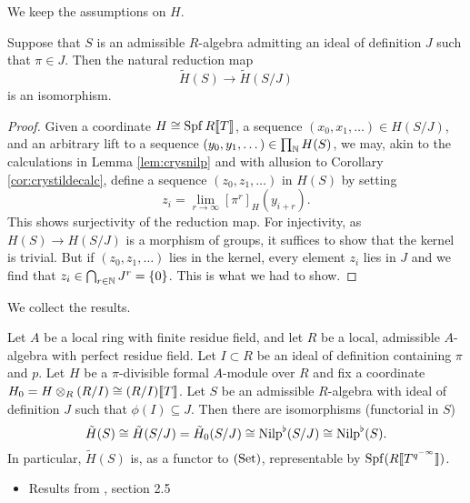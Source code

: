 We keep the assumptions on $H$.
\begin{lem}
  Suppose that $S$ is an admissible $R$-algebra admitting an ideal of definition
  $J$ such that $\pi \in J$. Then the natural reduction map
  \begin{equation*}
    \tilde H(S) \to \tilde H(S/J)
  \end{equation*}
  is an isomorphism.
  \begin{proof}[Proof]
    Given a coordinate $H \cong \operatorname{Spf} R\llbracket T \rrbracket$, a sequence $(x_0, x_1,
    \dots) \in H(S/J)$, and an arbitrary lift to a sequence $(y_0, y_1, \dots)
    \in \prod_{\mathbb{N}} H(S)$, we may, akin to
    the calculations in Lemma \ref{lem:crysnilp} and with allusion to Corollary
    \ref{cor:crystildecalc}, define a sequence $(z_0, z_1, \dots)$ in
    $H(S)$ by setting 
    \begin{equation*}
      z_i = \lim_{r \to \infty} [\pi^r]_{H}(y_{i+r}).
    \end{equation*}
    This shows surjectivity of the reduction map. For injectivity,
    as $H(S) \to H(S/J)$ is a morphism of groups, it suffices to show that the kernel
    is trivial. But if $(z_0, z_1, \dots)$ lies in the kernel, every element 
    $z_i$ lies in $J$ and we find that $z_i \in \bigcap_{r \in \mathbb{N}} J^r = \{0\}$.
    This is what we had to show.
  \end{proof}
\end{lem}

We collect the results. 
\begin{prop}
  Let $A$ be a local ring with finite residue field, and let $R$ be a local, admissible 
  $A$-algebra with perfect residue field. Let $I \subset R$ be an ideal of
  definition containing $\pi$ and $p$. Let $H$ be a $\pi$-divisible formal
  $A$-module over $R$ and fix a coordinate $H_0 = H\otimes_R(R/I) \cong
  (R/I) \llbracket T \rrbracket$. 
  Let $S$ be an admissible $R$-algebra with ideal of definition $J$ such that 
  $\phi(I) \subseteq J$. Then there are isomorphisms (functorial in $S$)
      \begin{equation*}
        \tilde H(S) \cong \tilde H(S/J) = \tilde H_0(S/J) \cong {\mathrm{Nilp}}^\flat(S/J) \cong
        {\mathrm{Nilp}}^\flat(S).
      \end{equation*}
  In particular, $\tilde H(S)$ is, as a functor to ${(\mathrm{Set})}$, representable by
  $\operatorname{Spf}(R \llbracket T^{q^{-\infty}} \rrbracket)$.
\end{prop}

\begin{itemize}
  \item Results from \cite{BoyarchenkoWeinstein2011MaxVar}, section 2.5
\end{itemize}



